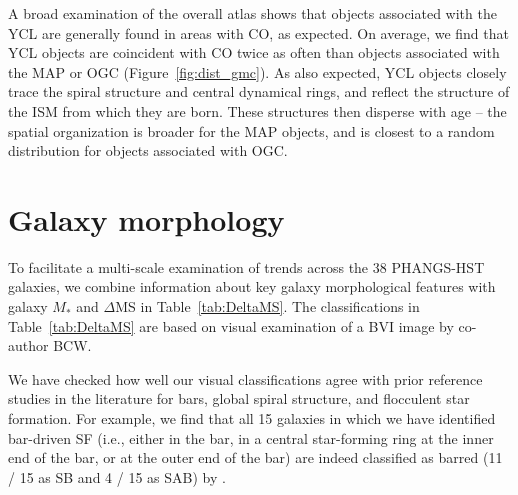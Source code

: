 \documentclass[linenumbers]{aastex63}
\begin{document}
{A broad examination of the overall atlas shows that objects associated with the YCL are generally found in areas with CO, as expected. On average, we find that YCL objects are coincident with CO twice as often than objects associated with the MAP or OGC (Figure~\ref{fig:dist_gmc}).   As also expected, YCL objects closely trace the spiral structure and central dynamical rings, and reflect the structure of the ISM from which they are born.  These structures then disperse with age -- the spatial organization is broader for the MAP objects, and is closest to a random distribution for objects associated with OGC.


\section{Galaxy morphology}
To facilitate a multi-scale examination of trends across the 38 PHANGS-HST galaxies, we combine information about key galaxy morphological features with galaxy $M_*$ and $\Delta$MS in Table~\ref{tab:DeltaMS}. The classifications in Table~\ref{tab:DeltaMS} are based on visual examination of a BVI image by co-author BCW. 

We have checked how well our visual classifications agree with prior reference studies in the literature for bars, global spiral structure, and flocculent star formation. For example, we find that all 15 galaxies in which we have identified 
bar-driven SF (i.e., either in the bar, in a central star-forming ring at the inner end of the bar, or at the outer end of the bar) are indeed classified as barred (11 / 15 as SB and 4 / 15 as SAB) by \citet{buta15}. 

}
\end{document}
